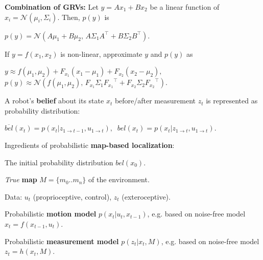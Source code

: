 \documentclass[landscape]{article}
\newcommand{\vmspace}{\vspace{-7pt}}
\newcommand{\vpspace}{\vspace{5pt}}
\begin{document}
\begin{multicols}{3}
\vpspace

\begin{minipage}{\columnwidth}
  \textbf{Combination of GRVs:} Let $y=Ax_1 + Bx_2$ be a linear function of
  $x_i=\mathcal N(\mu_i, \Sigma_i)$. Then, $p(y)$ is
  \vmspace
  \begin{center}
    $
    p(y) = \mathcal N (A\mu_1 + B\mu_2,\,
    A\Sigma_1A^\intercal + B\Sigma_2B^\intercal).
    $
  \end{center}
  \vmspace
  If $y=f(x_1,x_2)$ is non-linear, approximate $y$ and $p(y)$ as
  \vmspace
  \begin{center}
    $
    y \approx f(\mu_1, \mu_2) + F_{x_1} (x_1 - \mu_1) + F_{x_2}(x_2 -
    \mu_2),\;\;$\\
    $p(y) \approx \mathcal N(f(\mu_1, \mu_2),\,
    F_{x_1}\Sigma_1{F_{x_1}}^\intercal +
    F_{x_2}\Sigma_2{F_{x_2}}^\intercal).
    $
  \end{center}
\end{minipage}

\vpspace

\begin{minipage}{\columnwidth}
  A robot's \textbf{belief} about its state $x_t$ before/after measurement $z_t$
  is represented as probability distribution:
  \vmspace
  \begin{center}
    $
    \overline{bel}(x_t)
    =
    p(x_t | z_{1 \rightarrow t-1}, u_{1 \rightarrow t}),\;\;
    bel(x_t)
    =
    p(x_t | z_{1 \rightarrow t}, u_{1 \rightarrow t}).
    $
  \end{center}
\end{minipage}

\vpspace

\begin{minipage}{\columnwidth}
  Ingredients of probabilistic \textbf{map-based localization}:
  \begin{compactenum}
  \item The initial probability distribution $bel(x_0)$.
  \item \textit{True} \textbf{map} $M = \{m_0.. m_n\}$ of the environment.
  \item Data: $u_t$ (proprioceptive, control), $z_t$ (exteroceptive).
  \item Probabilistic \textbf{motion model} $p(x_t|u_t, x_{t-1})$, e.g. based on
    noise-free model $x_t = f(x_{t-1}, u_t)$.
  \item Probabilistic \textbf{measurement model} $p(z_t|x_t,M)$, e.g. based on
    noise-free model $z_t = h(x_t, M)$.
  \end{compactenum}
\end{minipage}


\end{multicols}
\end{document}
